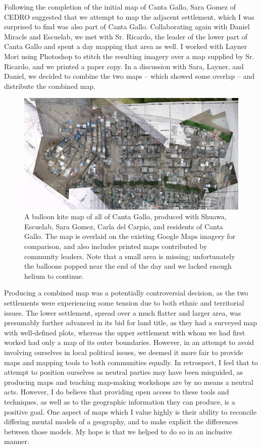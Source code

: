 \documentclass[11pt]{report}
\begin{document}
Following the completion of the initial map of Canta Gallo, Sara Gomez of CEDRO suggested that we attempt to map the adjacent settlement, which I was surprised to find was also part of Canta Gallo. Collaborating again with Daniel Miracle and Escuelab, we met with Sr. Ricardo, the leader of the lower part of Canta Gallo and spent a day mapping that area as well. I worked with Layner Mori using Photoshop to stitch the resulting imagery over a map supplied by Sr. Ricardo, and we printed a paper copy. In a discussion with Sara, Layner, and Daniel, we decided to combine the two maps -- which showed some overlap -- and distribute the combined map. 

\begin{figure}[h]
  \begin{center}
	\includegraphics[width=1\textwidth]{images/cantagallo-combined.jpg}
	\caption{A balloon kite map of all of Canta Gallo, produced with Shuawa, Escuelab, Sara Gomez, Carla del Carpio, and residents of Canta Gallo. The map is overlaid on the existing Google Maps imagery for comparison, and also includes printed maps contributed by community leaders. Note that a small area is missing; unfortunately the balloons popped near the end of the day and we lacked enough helium to continue.}
  \end{center}
\end{figure}

Producing a combined map was a potentially controversial decision, as the two settlements were experiencing some tension due to both ethnic and territorial issues. The lower settlement, spread over a much flatter and larger area, was presumably further advanced in its bid for land title, as they had a surveyed map with well-defined plots, whereas the upper settlement with whom we had first worked had only a map of its outer boundaries. However, in an attempt to avoid involving ourselves in local political issues, we deemed it more fair to provide maps and mapping tools to both communities equally. In retrospect, I feel that to attempt to position ourselves as neutral parties may have been misguided, as producing maps and teaching map-making workshops are by no means a neutral acts. However, I do believe that providing open access to these tools and techniques, as well as to the geographic information they can produce, is a positive goal. One aspect of maps which I value highly is their ability to reconcile differing mental models of a geography, and to make explicit the differences between those models. My hope is that we helped to do so in an inclusive manner. 
\end{document}

